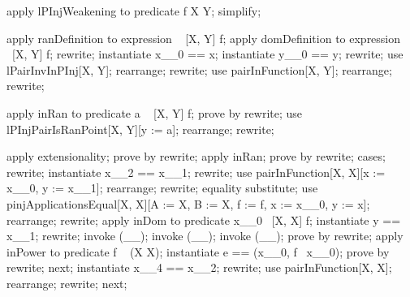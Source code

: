 \begin{LPScript}\begin{forget}[lPInjWeakeningFresh]
apply lPInjWeakening to predicate f \in  X \pinj  Y;
simplify;
\end{forget}\end{LPScript}

\begin{LPScript}\begin{forget}[lPInjPairIsRanPoint]
apply ranDefinition to expression \ran~ [X, Y] f;
apply domDefinition to expression \dom~[X, Y] f;
rewrite;
instantiate x\_\_0 == x;
instantiate y\_\_0 == y;
rewrite;
use lPairInvInPInj[X, Y];
rearrange;
rewrite;
use pairInFunction[X, Y];
rearrange;
rewrite;
\end{forget}\end{LPScript}

\begin{LPScript}\begin{forget}[lApplyInvInDomPInj]
apply inRan to predicate a \in  \ran~ [X, Y] f;
prove by rewrite;
use lPInjPairIsRanPoint[X, Y][y := a];
rearrange;
rewrite;
\end{forget}\end{LPScript}

\begin{LPScript}\begin{forget}[lHomogeneousElemRanNDresPInj]
apply extensionality;
prove by rewrite;
apply inRan;
prove by rewrite;
cases;
rewrite;
instantiate x\_\_2 == x\_\_1;
rewrite;
use pairInFunction[X, X][x := x\_\_0, y := x\_\_1];
rearrange;
rewrite;
equality substitute;
use pinjApplicationsEqual[X, X][A := X, B := X, f := f, x := x\_\_0, y := x];
rearrange;
rewrite;
apply inDom to predicate x\_\_0 \in  \dom~[X, X] f;
instantiate y == x\_\_1;
rewrite;
invoke (\_\pinj \_);
invoke (\_\pfun \_);
invoke (\_\rel \_);
prove by rewrite;
apply inPower to predicate f \in  \power~  (X \cross  X);
instantiate e == (x\_\_0, f~ x\_\_0);
prove by rewrite;
next;
instantiate x\_\_4 == x\_\_2;
rewrite;
use pairInFunction[X, X];
rearrange;
rewrite;
next;
\end{forget}\end{LPScript}

